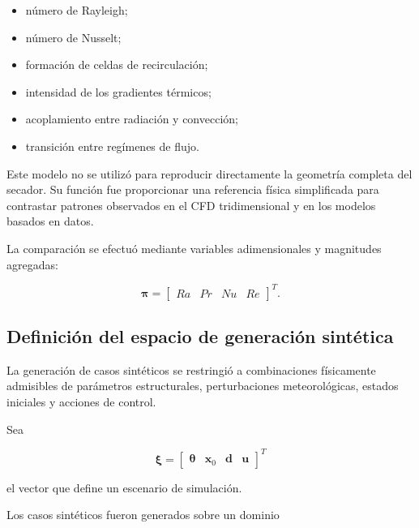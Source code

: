 \begin{itemize}
    \item número de Rayleigh;
    \item número de Nusselt;
    \item formación de celdas de recirculación;
    \item intensidad de los gradientes térmicos;
    \item acoplamiento entre radiación y convección;
    \item transición entre regímenes de flujo.
\end{itemize}

Este modelo no se utilizó para reproducir directamente la geometría completa del secador. Su función fue proporcionar una referencia física simplificada para contrastar patrones observados en el CFD tridimensional y en los modelos basados en datos.

La comparación se efectuó mediante variables adimensionales y magnitudes agregadas:

\begin{equation}
\boldsymbol{\pi}
=
\begin{bmatrix}
Ra &
Pr &
Nu &
Re
\end{bmatrix}^{T}.
\label{eq:variables_adimensionales_validacion_cruzada}
\end{equation}

\subsection{Definición del espacio de generación sintética}
\label{subsec:espacio_generacion_sintetica}

La generación de casos sintéticos se restringió a combinaciones físicamente admisibles de parámetros estructurales, perturbaciones meteorológicas, estados iniciales y acciones de control.

Sea

\begin{equation}
\boldsymbol{\xi}
=
\begin{bmatrix}
\boldsymbol{\theta} &
\mathbf{x}_0 &
\mathbf{d} &
\mathbf{u}
\end{bmatrix}^{T}
\end{equation}

el vector que define un escenario de simulación.

Los casos sintéticos fueron generados sobre un dominio

